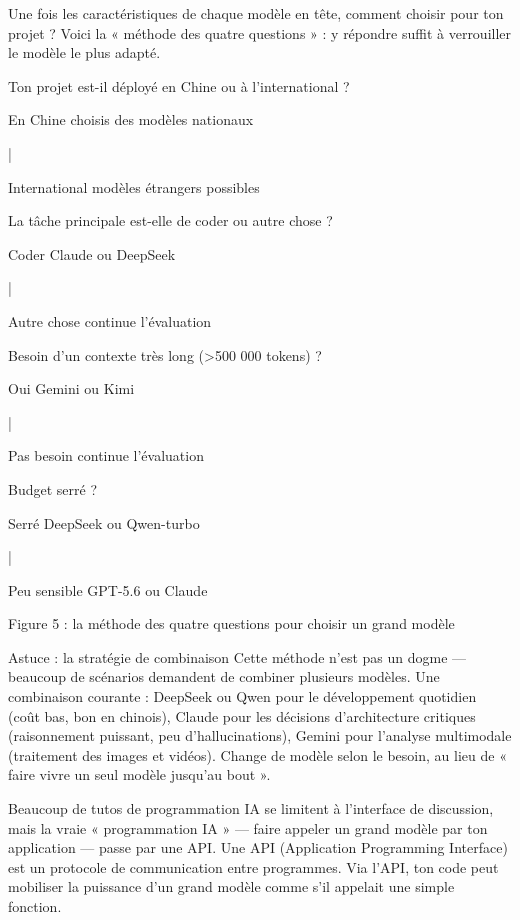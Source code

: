 
Une fois les caractéristiques de chaque modèle en tête, comment choisir pour ton projet ? Voici la « méthode des quatre questions » : y répondre suffit à verrouiller le modèle le plus adapté.

Ton projet est-il déployé en Chine ou à l'international ?

En Chine choisis des modèles nationaux

|

International modèles étrangers possibles

La tâche principale est-elle de coder ou autre chose ?

Coder Claude ou DeepSeek

|

Autre chose continue l'évaluation

Besoin d'un contexte très long (>500 000 tokens) ?

Oui Gemini ou Kimi

|

Pas besoin continue l'évaluation

Budget serré ?

Serré DeepSeek ou Qwen-turbo

|

Peu sensible GPT-5.6 ou Claude

\begin{center}\small\color{gray}Figure 5 : la méthode des quatre questions pour choisir un grand modèle\end{center}

\begin{tcbinfo}{Astuce : la stratégie de combinaison}
Cette méthode n'est pas un dogme — beaucoup de scénarios demandent de combiner plusieurs modèles. Une combinaison courante : DeepSeek ou Qwen pour le développement quotidien (coût bas, bon en chinois), Claude pour les décisions d'architecture critiques (raisonnement puissant, peu d'hallucinations), Gemini pour l'analyse multimodale (traitement des images et vidéos). Change de modèle selon le besoin, au lieu de « faire vivre un seul modèle jusqu'au bout ».

\end{tcbinfo}


Beaucoup de tutos de programmation IA se limitent à l'interface de discussion, mais la vraie « programmation IA » — faire appeler un grand modèle par ton application — passe par une API. Une API (Application Programming Interface) est un protocole de communication entre programmes. Via l'API, ton code peut mobiliser la puissance d'un grand modèle comme s'il appelait une simple fonction.

